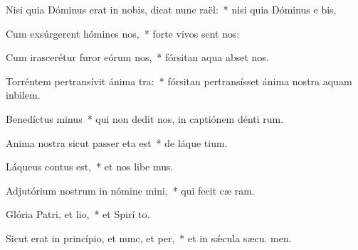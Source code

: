 \item Nisi quia Dóminus erat in nobis, dicat nunc raël:~* nisi quia Dóminus e  bis,
\item Cum exsúrgerent hómines  nos,~* forte vivos sent nos:
\item Cum irascerétur furor eórum  nos,~* fórsitan aqua abset nos.
\item Torréntem pertransívit ánima tra:~* fórsitan pertransísset ánima nostra aquam inbilem.
\item Benedíctus minus~* qui non dedit nos, in captiónem dénti rum.
\item Anima nostra sicut passer eta est~* de láque tium.
\item Láqueus contus est,~* et nos libe mus.
\item Adjutórium nostrum in nómine mini,~* qui fecit cæ  ram.
\item Glória Patri, et lio,~* et Spirí to.
\item Sicut erat in princípio, et nunc, et per,~* et in sǽcula sæcu. men.
